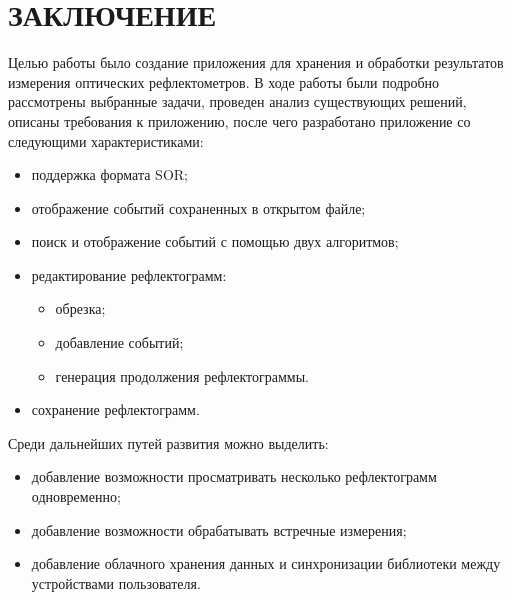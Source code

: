 \documentclass[a4paper]{article}
\begin{document}
\newpage


\newpage


\newpage


\newpage
\section*{ЗАКЛЮЧЕНИЕ}

Целью работы было создание приложения для хранения и обработки результатов измерения оптических рефлектометров. В ходе работы были подробно рассмотрены выбранные задачи, проведен анализ существующих решений, описаны требования к приложению, после чего разработано приложение со следующими характеристиками:

\begin{itemize}
  \item поддержка формата SOR;
  \item отображение событий сохраненных в открытом файле;
  \item поиск и отображение событий с помощью двух алгоритмов;
  \item редактирование рефлектограмм:
  \begin{itemize}
    \item обрезка;
    \item добавление событий;
    \item генерация продолжения рефлектограммы.
  \end{itemize}
  \item сохранение рефлектограмм.
\end{itemize}

\noindent Среди дальнейших путей развития можно выделить:

\begin{itemize}
  \item добавление возможности просматривать несколько рефлектограмм одновременно;
  \item добавление возможности обрабатывать встречные измерения;
  \item добавление облачного хранения данных и синхронизации библиотеки между устройствами пользователя.
\end{itemize}

\newpage
\printbibliography[
  heading=bibintoc, 
  title={СПИСОК ИСПОЛЬЗОВАННЫХ ИСТОЧНИКОВ}
]

\newpage

\end{document}
